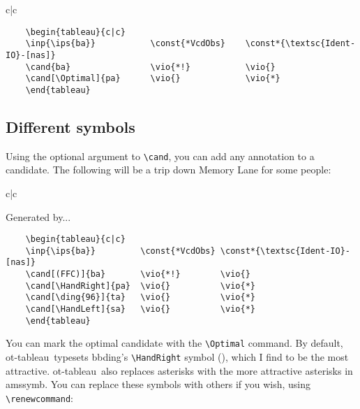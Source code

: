 \documentclass{article}
\def\tabl{\textsf{ot-tableau}}
\begin{document}
\CircledViolationsOn
\begin{center}
	\begin{tableau}{c|c}
				
			\vio{*!}	\vio{}
		\vio{}		\vio{*}
	\end{tableau}
\end{center}
\CircledViolationsOff

\begin{verbatim}
	\begin{tableau}{c|c}
	\inp{\ips{ba}}           \const{*VcdObs}    \const*{\textsc{Ident-IO}-[nas]}
	\cand{ba}                \vio{*!}           \vio{}
	\cand[\Optimal]{pa}      \vio{}             \vio{*}
	\end{tableau}
\end{verbatim}

\subsection{Different symbols}
Using the optional argument to \verb+\cand+, you can add any annotation to a candidate. The following will be a trip down Memory Lane for some people:

\begin{center}
	\begin{tableau}{c|c}
	          
	       \vio{*!}        \vio{}
	  \vio{}          \vio{*}
	   \vio{}          \vio{*}
	   \vio{}          \vio{*}
	\end{tableau}
\end{center}

\noindent Generated by...

\begin{verbatim}
	\begin{tableau}{c|c}
	\inp{\ips{ba}}         \const{*VcdObs} \const*{\textsc{Ident-IO}-[nas]}
	\cand[(FFC)]{ba}       \vio{*!}        \vio{}
	\cand[\HandRight]{pa}  \vio{}          \vio{*}
	\cand[\ding{96}]{ta}   \vio{}          \vio{*}
	\cand[\HandLeft]{sa}   \vio{}          \vio{*}
	\end{tableau}
\end{verbatim}

You can mark the optimal candidate with the \verb+\Optimal+ command. By default, \tabl\ typesets \textsf{bbding}'s \verb+\HandRight+ symbol (\HandRight), which I find to be the most attractive. \tabl\ also replaces asterisks with the more attractive asterisks in \textsf{amssymb}. You can replace these symbols with others if you wish, using \verb+\renewcommand+:
\end{document}
